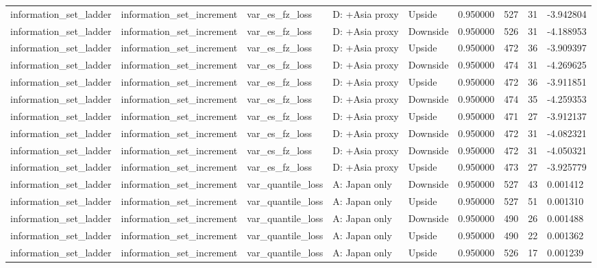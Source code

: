 \begin{tabular}{lllllrrr}
information\_set\_ladder & information\_set\_increment & var\_es\_fz\_loss & D: +Asia proxy & Upside & 0.950000 & 527 & 31 & -3.942804 \\
information\_set\_ladder & information\_set\_increment & var\_es\_fz\_loss & D: +Asia proxy & Downside & 0.950000 & 526 & 31 & -4.188953 \\
information\_set\_ladder & information\_set\_increment & var\_es\_fz\_loss & D: +Asia proxy & Upside & 0.950000 & 472 & 36 & -3.909397 \\
information\_set\_ladder & information\_set\_increment & var\_es\_fz\_loss & D: +Asia proxy & Downside & 0.950000 & 474 & 31 & -4.269625 \\
information\_set\_ladder & information\_set\_increment & var\_es\_fz\_loss & D: +Asia proxy & Upside & 0.950000 & 472 & 36 & -3.911851 \\
information\_set\_ladder & information\_set\_increment & var\_es\_fz\_loss & D: +Asia proxy & Downside & 0.950000 & 474 & 35 & -4.259353 \\
information\_set\_ladder & information\_set\_increment & var\_es\_fz\_loss & D: +Asia proxy & Upside & 0.950000 & 471 & 27 & -3.912137 \\
information\_set\_ladder & information\_set\_increment & var\_es\_fz\_loss & D: +Asia proxy & Downside & 0.950000 & 472 & 31 & -4.082321 \\
information\_set\_ladder & information\_set\_increment & var\_es\_fz\_loss & D: +Asia proxy & Downside & 0.950000 & 472 & 31 & -4.050321 \\
information\_set\_ladder & information\_set\_increment & var\_es\_fz\_loss & D: +Asia proxy & Upside & 0.950000 & 473 & 27 & -3.925779 \\
information\_set\_ladder & information\_set\_increment & var\_quantile\_loss & A: Japan only & Downside & 0.950000 & 527 & 43 & 0.001412 \\
information\_set\_ladder & information\_set\_increment & var\_quantile\_loss & A: Japan only & Upside & 0.950000 & 527 & 51 & 0.001310 \\
information\_set\_ladder & information\_set\_increment & var\_quantile\_loss & A: Japan only & Downside & 0.950000 & 490 & 26 & 0.001488 \\
information\_set\_ladder & information\_set\_increment & var\_quantile\_loss & A: Japan only & Upside & 0.950000 & 490 & 22 & 0.001362 \\
information\_set\_ladder & information\_set\_increment & var\_quantile\_loss & A: Japan only & Upside & 0.950000 & 526 & 17 & 0.001239 \\

\end{tabular}
